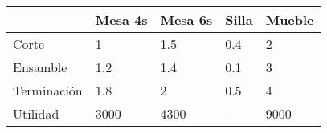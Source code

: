 \begin{table}[H]
\centering
\begin{tabular}{lllll}
\hline
            & Mesa 4s & Mesa 6s & Silla & Mueble \\
\hline
Corte       & 1       & 1.5     & 0.4   & 2      \\
Ensamble    & 1.2     & 1.4     & 0.1   & 3      \\
Terminación & 1.8     & 2       & 0.5   & 4      \\
\hline
Utilidad    & 3000    & 4300    & --    & 9000   \\
\hline
\end{tabular}
\label{tabla:1}
\end{table}

